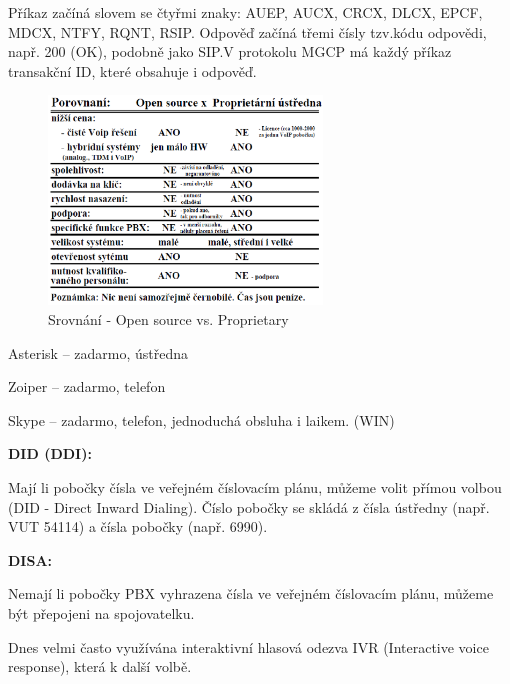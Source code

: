 Příkaz začíná slovem se čtyřmi znaky: AUEP, AUCX, CRCX, DLCX, EPCF, MDCX, NTFY, RQNT, RSIP.\@
Odpověď začíná třemi čísly tzv.\@ kódu odpovědi, např. 200 (OK), podobně jako SIP.\@ V protokolu MGCP má každý příkaz transakční ID, které obsahuje i odpověď.





\begin{figure}[h!]
    \begin{center}
        \includegraphics[height=15em]{images/otazka3.png}
        \caption{Srovnání - Open source vs. Proprietary}
        \label{img:1}
    \end{center}
\end{figure}

\noindent Asterisk -- zadarmo, ústředna

\noindent Zoiper -- zadarmo, telefon

\noindent Skype -- zadarmo, telefon, jednoduchá obsluha i laikem. (WIN)





\textbf{DID (DDI):}

Mají li pobočky čísla ve veřejném číslovacím plánu, můžeme volit přímou volbou (DID - Direct Inward Dialing). Číslo pobočky se skládá z čísla ústředny (např. VUT 54114) a čísla pobočky (např. 6990).

\noindent\textbf{DISA:}

Nemají li pobočky PBX vyhrazena čísla ve veřejném číslovacím plánu, můžeme být přepojeni na spojovatelku.

Dnes velmi často využívána interaktivní hlasová odezva IVR (Interactive voice response), která  k další volbě.

